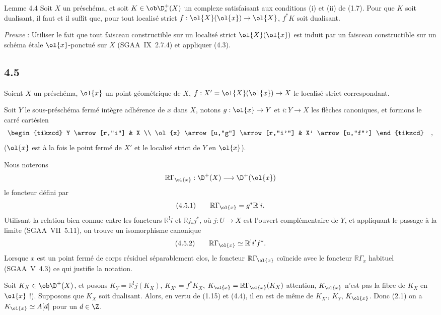 \begin{statement}{Lemme 4.4}
Soit $X$ un préschéma, et soit $K\in\ob\D_c^+(X)$ un complexe satisfaisant aux conditions (i) et (ii) de (1.7). Pour que $K$ soit dualisant, il faut et il suffit que, pour tout localisé strict $f:\ol{X}(\ol{x})\to \ol{X}$, $f^*K$ soit dualisant.
\end{statement}

\emph{Preuve} : Utiliser le fait que tout faisceau constructible sur un localisé strict $\ol{X}(\ol{x})$ est induit par un faisceau constructible sur un schéma étale $\ol{x}$-ponctué sur $X$ (SGAA~IX~2.7.4) et appliquer (4.3).

\subsection*{4.5}
Soient $X$ un préschéma, $\ol{x}$ un point géométrique de $X$, $f:X'=\ol{X}(\ol{x})\to X$ le localisé strict correspondant.

Soit $Y$ le sous-préschéma fermé intègre adhérence de $x$ dans $X$, notons $g:\ol{x}\to Y$ et $i:Y\to X$ les flèches canoniques, et formons le carré cartésien
\[
\begin{tikzcd}
Y \arrow[r,"i"] & X \\
\ol{x} \arrow[u,"g"] \arrow[r,"i'"] & X' \arrow[u,"f"']
\end{tikzcd}\quad ,
\]
($\ol{x}$ est à la fois le point fermé de $X'$ et le localisé strict de $Y$ en $\ol{x}$).

Nous noterons
\[
\mathbb{R}\Gamma_{\ol{x}}:\D^+(X)\longrightarrow \D^+(\ol{x})
\]
le foncteur défini par
\[
(4.5.1)\qquad \mathbb{R}\Gamma_{\ol{x}}=g^*\mathbb{R}^{!}i.
\]
Utilisant la relation bien connue entre les foncteurs $\mathbb{R}^{!}i$ et $\mathbb{R} j_*j^*$, où $j:U\to X$ est l'ouvert complémentaire de $Y$, et appliquant le passage à la limite (SGAA~VII~5.11), on trouve un isomorphisme canonique
\[
(4.5.2)\qquad \mathbb{R}\Gamma_{\ol{x}}\simeq\mathbb{R}^{!}i' f^*.
\]
Lorsque $x$ est un point fermé de corps résiduel séparablement clos, le foncteur $\mathbb{R}\Gamma_{\ol{x}}$ coïncide avec le foncteur $\mathbb{R}\Gamma_x$ habituel (SGAA~V~4.3) ce qui justifie la notation.

Soit $K_X\in\ob\D^+(X)$, et posons $K_Y=\mathbb{R}^{!}j(K_X)$, $K_{X'}=f^*K_X$, $K_{\ol{x}}=\mathbb{R}\Gamma_{\ol{x}}(K_X)$ attention, $K_{\ol{x}}$ n'est pas la fibre de $K_X$ en $\ol{x}$ !). Supposons que $K_X$ soit dualisant. Alors, en vertu de (1.15) et (4.4), il en est de même de $K_{X'}$, $K_Y$, $K_{\ol{x}}$. Donc (2.1) on a $K_{\ol{x}}\simeq A[d]$ pour un $d\in\Z$.

